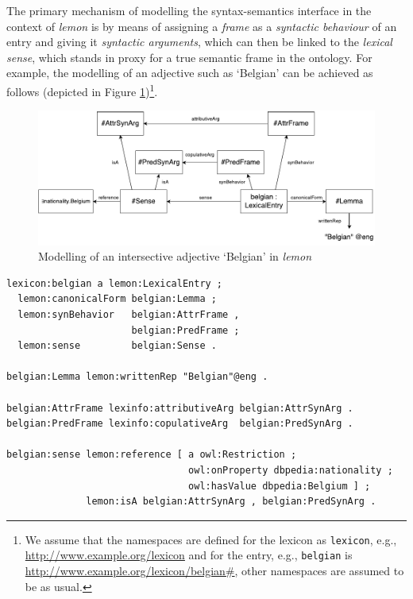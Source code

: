 \documentclass[11pt]{article}
\begin{document}
The primary mechanism of modelling the syntax-semantics interface in the context 
of \emph{lemon} is by means of assigning a \emph{frame} as a \emph{syntactic 
behaviour} of an entry and giving it \emph{syntactic arguments}, which can then 
be linked to the \emph{lexical sense}, which stands in proxy for a true semantic 
frame in the ontology. For example, the modelling of an adjective such as 
`Belgian' can be achieved as follows (depicted in Figure 
\ref{example-belgian})\footnote{We assume that the namespaces are defined for 
the lexicon as {\tt lexicon}, e.g., \url{http://www.example.org/lexicon}
and for the entry, e.g., {\tt belgian} is \url{http://www.example.org/lexicon/belgian#},
other namespaces are assumed to be as usual.}.

\begin{figure}
\includegraphics[width=\textwidth]{belgian-example}
\caption{Modelling of an intersective adjective `Belgian' in \emph{lemon}\label{example-belgian}}
\end{figure}

\begin{verbatim}
lexicon:belgian a lemon:LexicalEntry ;
  lemon:canonicalForm belgian:Lemma ;
  lemon:synBehavior   belgian:AttrFrame , 
                      belgian:PredFrame ;
  lemon:sense         belgian:Sense .

belgian:Lemma lemon:writtenRep "Belgian"@eng .

belgian:AttrFrame lexinfo:attributiveArg belgian:AttrSynArg .
belgian:PredFrame lexinfo:copulativeArg  belgian:PredSynArg .

belgian:sense lemon:reference [ a owl:Restriction ;
                                owl:onProperty dbpedia:nationality ;
                                owl:hasValue dbpedia:Belgium ] ;
              lemon:isA belgian:AttrSynArg , belgian:PredSynArg .
\end{verbatim}
\end{document}
